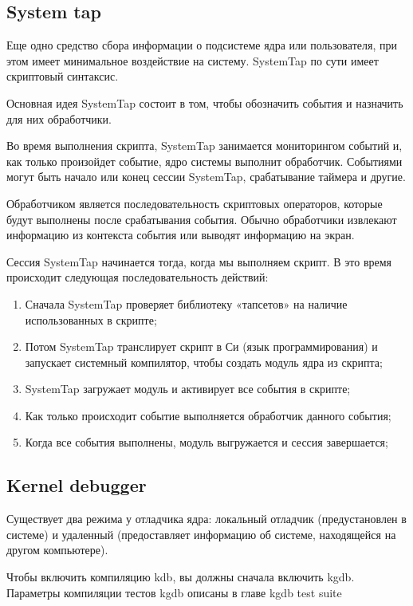 \documentclass[bachelor, och, book]{SCWorks}
\theoremstyle{remark}
\begin{document}
    \subsection{System tap}

    Еще одно средство сбора информации о подсистеме ядра или пользователя, при этом имеет минимальное воздействие на систему. SystemTap по сути имеет скриптовый синтаксис.

    Основная идея SystemTap состоит в том, чтобы обозначить события и назначить для них обработчики.

    Во время выполнения скрипта, SystemTap занимается мониторингом событий и, как только произойдет событие, ядро системы выполнит обработчик.
    Событиями могут быть начало или конец сессии SystemTap, срабатывание таймера и другие.

    Обработчиком является последовательность скриптовых операторов, которые будут выполнены после срабатывания события. Обычно обработчики извлекают информацию из контекста события или выводят информацию на экран.

    Сессия SystemTap начинается тогда, когда мы выполняем скрипт. В это время происходит следующая последовательность действий:

    \begin{enumerate}
        \item Сначала SystemTap проверяет библиотеку «тапсетов» на наличие использованных в скрипте;
        \item Потом SystemTap транслирует скрипт в Си (язык программирования) и запускает системный компилятор, чтобы создать модуль ядра из скрипта;
        \item SystemTap загружает модуль и активирует все события в скрипте;
        \item Как только происходит событие выполняется обработчик данного события;
        \item Когда все события выполнены, модуль выгружается и сессия завершается;
    \end{enumerate}

    \subsection{Kernel debugger}
    Существует два режима у отладчика ядра: локальный отладчик (предустановлен в системе) и удаленный (предоставляет информацию об системе, находящейся на другом компьютере).

    Чтобы включить компиляцию kdb, вы должны сначала включить kgdb. Параметры компиляции тестов kgdb описаны в главе kgdb test suite 
    
\end{document}

